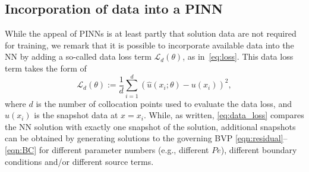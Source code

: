 \documentclass[oneside,final]{csri23}
\newcommand{\ikt}[1]{\textcolor{red}{IKT comment: #1}}
\newcommand{\todo}[1]{\textcolor{blue}{TODO: #1}}
\begin{document}
\subsection{Incorporation of data into a PINN} \label{WDS:sec_data}

While the appeal of PINNs is at least partly that solution data are not required for training, we remark that it is possible to incorporate available data into the NN by adding a so-called data loss term $\mathcal{L}_d(\theta)$, as in~\eqref{eq:loss}. This data loss term takes the form of 
\begin{equation} \label{eq:data_loss}
    \mathcal{L}_d(\theta) := \frac{1}{d}\sum_{i=1}^d\left(\hat{u}(x_i; \theta) - u(x_i) \right)^2,
\end{equation}
where $d$ is the number of collocation points used to evaluate the data loss, and $u(x_i)$ is the snapshot data at $x=x_i$.  While, as written, \eqref{eq:data_loss} compares the NN solution with exactly one snapshot of the solution, additional snapshots can be obtained by generating solutions to the governing BVP \eqref{eqn:residual}--\eqref{eqn:BC} for different parameter numbers (e.g., different $Pe$), different boundary conditions and/or different source terms.  



\end{document}
